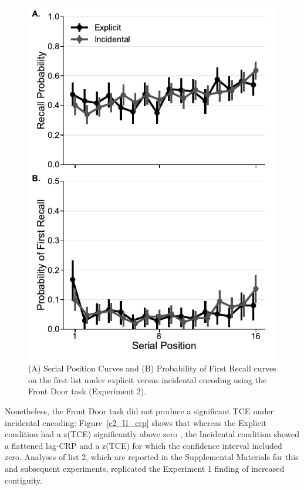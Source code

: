 \documentclass[man,natbib,floatsintext]{apa6} %
\begin{document}
\begin{figure}
\includegraphics{figures/E2_spc_list1.pdf}
\caption{(A) Serial Position Curves and (B) Probability of First Recall curves on the first list under explicit versus incidental encoding using the Front Door task (Experiment 2). \spcpaneltext}
\label{e2_l1_spc}
\end{figure}

\color{black}

Nonetheless, the Front Door task did not produce a significant TCE under incidental encoding: Figure~\ref{e2_l1_crp} shows that whereas the Explicit condition \color{red} had a \label{done-11} z(TCE) significantly above zero \color{black}, the Incidental condition showed a flattened lag-CRP and a z(TCE) for which the confidence interval included zero. \color{red} Analyses of list 2, which are reported in the Supplemental Materials for this and subsequent experiments, replicated the Experiment 1 finding of increased contiguity. \color{black}
\end{document}
